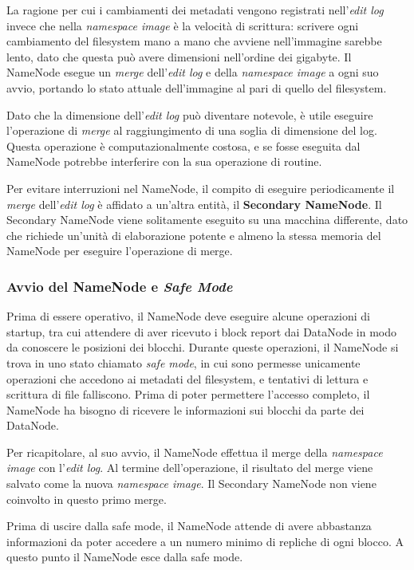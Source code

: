 \documentclass[italian,a4paper, twoside, 12pt]{report}
\begin{document}
La ragione per cui i cambiamenti dei metadati vengono registrati
nell'\emph{edit log} invece che nella \emph{namespace image} è la
velocità di scrittura: scrivere ogni cambiamento del filesystem mano a
mano che avviene nell'immagine sarebbe lento, dato che questa può avere
dimensioni nell'ordine dei gigabyte. Il NameNode esegue un \emph{merge}
dell'\emph{edit log} e della \emph{namespace image} a ogni suo avvio,
portando lo stato attuale dell'immagine al pari di quello del
filesystem.

Dato che la dimensione dell'\emph{edit log} può diventare notevole, è
utile eseguire l'operazione di \emph{merge} al raggiungimento di una
soglia di dimensione del log. Questa operazione è computazionalmente
costosa, e se fosse eseguita dal NameNode potrebbe interferire con la
sua operazione di routine.

Per evitare interruzioni nel NameNode, il compito di eseguire
periodicamente il \emph{merge} dell'\emph{edit log} è affidato a
un'altra entità, il \textbf{Secondary NameNode}. Il Secondary NameNode
viene solitamente eseguito su una macchina differente, dato che richiede
un'unità di elaborazione potente e almeno la stessa memoria del NameNode
per eseguire l'operazione di merge.

\subsubsection{\texorpdfstring{Avvio del NameNode e \emph{Safe
Mode}}{Avvio del NameNode e Safe Mode}}\label{avvio-del-namenode-e-safe-mode}

Prima di essere operativo, il NameNode deve eseguire alcune operazioni
di startup, tra cui attendere di aver ricevuto i block report dai
DataNode in modo da conoscere le posizioni dei blocchi. Durante queste
operazioni, il NameNode si trova in uno stato chiamato \emph{safe mode},
in cui sono permesse unicamente operazioni che accedono ai metadati del
filesystem, e tentativi di lettura e scrittura di file falliscono. Prima
di poter permettere l'accesso completo, il NameNode ha bisogno di
ricevere le informazioni sui blocchi da parte dei DataNode.

Per ricapitolare, al suo avvio, il NameNode effettua il merge della
\emph{namespace image} con l'\emph{edit log}. Al termine
dell'operazione, il risultato del merge viene salvato come la nuova
\emph{namespace image}. Il Secondary NameNode non viene coinvolto in
questo primo merge.

Prima di uscire dalla safe mode, il NameNode attende di avere abbastanza
informazioni da poter accedere a un numero minimo di repliche di ogni
blocco. A questo punto il NameNode esce dalla safe mode.
\end{document}
